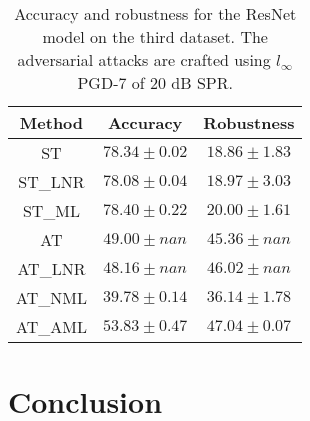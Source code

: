 \documentclass[conference]{IEEEtran}
\begin{document}
\begin{table}[htbp]
	\centering
	\begin{tabular}{c|cc}
	    Method & Accuracy & Robustness \\
		\hline
		ST & $78.34 \pm 0.02$ & $18.86 \pm 1.83$ \\ 
		ST\_LNR & $78.08 \pm 0.04$ & $18.97 \pm 3.03$ \\ 
		ST\_ML & $78.40 \pm 0.22$ & $20.00 \pm 1.61$ \\ 
		AT & $49.00 \pm nan$ & $45.36 \pm nan$ \\ 
		AT\_LNR & $48.16 \pm nan$ & $46.02 \pm nan$ \\ 
		AT\_NML & $39.78 \pm 0.14$ & $36.14 \pm 1.78$ \\ 
		AT\_AML & $53.83 \pm 0.47$ & $47.04 \pm 0.07$ \\ 
    \end{tabular}
    \caption{Accuracy and robustness for the ResNet model on the third dataset. The adversarial attacks are crafted using $l_{\infty}$ PGD-7 of 20 dB SPR.}
    \label{tab:sp0c20}
\end{table}


\section{Conclusion}





\end{document}
